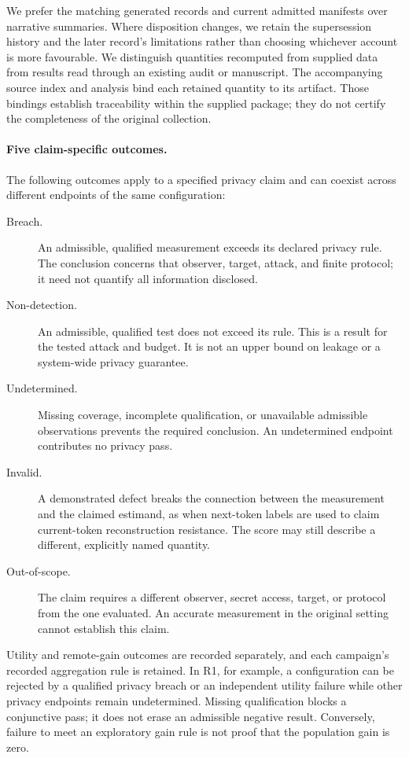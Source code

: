 We prefer the matching generated records and current admitted manifests
over narrative summaries. Where disposition changes, we retain the
supersession history and the later record's limitations rather than choosing
whichever account is more favourable. We distinguish quantities recomputed
from supplied data from results read through an existing audit or manuscript.
The accompanying source index and analysis bind each retained quantity to
its artifact. Those bindings establish traceability within the supplied
package; they do not certify the completeness of the original collection.

\paragraph{Five claim-specific outcomes.}
The following outcomes apply to a specified privacy claim and can coexist
across different endpoints of the same configuration:
\begin{description}
  \item[Breach.] An admissible, qualified measurement exceeds its declared
    privacy rule. The conclusion concerns that observer, target, attack, and
    finite protocol; it need not quantify all information disclosed.
  \item[Non-detection.] An admissible, qualified test does not exceed its
    rule. This is a result for the tested attack and budget. It is not an
    upper bound on leakage or a system-wide privacy guarantee.
  \item[Undetermined.] Missing coverage, incomplete qualification, or
    unavailable admissible observations prevents the required conclusion.
    An undetermined endpoint contributes no privacy pass.
  \item[Invalid.] A demonstrated defect breaks the connection between the
    measurement and the claimed estimand, as when next-token labels are
    used to claim current-token reconstruction resistance. The score may
    still describe a different, explicitly named quantity.
  \item[Out-of-scope.] The claim requires a different observer, secret
    access, target, or protocol from the one evaluated. An accurate
    measurement in the original setting cannot establish this claim.
\end{description}

Utility and remote-gain outcomes are recorded separately, and each
campaign's recorded aggregation rule is retained. In R1, for example, a
configuration can be rejected by a qualified privacy breach or an
independent utility failure while other privacy endpoints remain
undetermined. Missing qualification blocks a conjunctive pass; it does not
erase an admissible negative result. Conversely, failure to meet an
exploratory gain rule is not proof that the population gain is zero.

